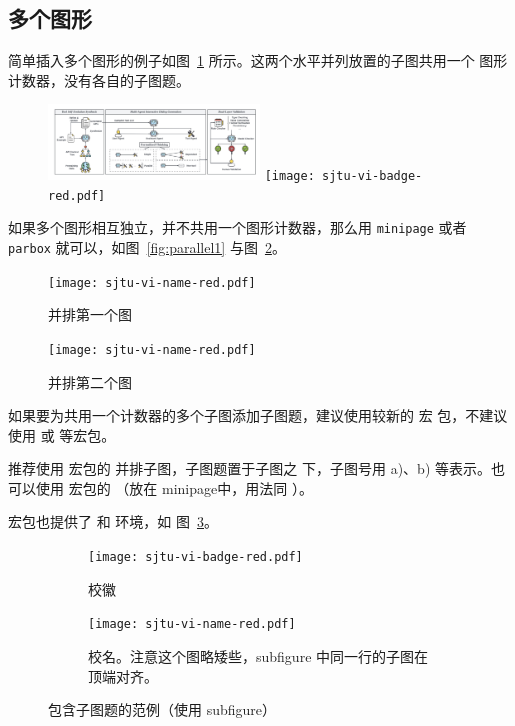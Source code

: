 \subsection{多个图形}

简单插入多个图形的例子如图~\ref{fig:SRR} 所示。这两个水平并列放置的子图共用一个
图形计数器，没有各自的子图题。

\begin{figure}[!htp]
  \centering
  \includegraphics[height=2cm]{../assets/1.png}
  \hspace{1cm}
  \texttt{[image: sjtu-vi-badge-red.pdf]}
  \label{fig:SRR}
\end{figure}

如果多个图形相互独立，并不共用一个图形计数器，那么用 \texttt{minipage} 或者
\texttt{parbox} 就可以，如图~\ref{fig:parallel1} 与图~\ref{fig:parallel2}。

\begin{figure}[!htp]
  \centering
  \begin{minipage}{0.48\textwidth}
    \centering
    \texttt{[image: sjtu-vi-name-red.pdf]}
    \caption{并排第一个图}
    \label{fig:parallel1}
  \end{minipage}\hfill
  \begin{minipage}{0.48\textwidth}
    \centering
    \texttt{[image: sjtu-vi-name-red.pdf]}
    \caption{并排第二个图}
    \label{fig:parallel2}
  \end{minipage}
\end{figure}

如果要为共用一个计数器的多个子图添加子图题，建议使用较新的  宏
包，不建议使用  或  等宏包。

推荐使用  宏包的  并排子图，子图题置于子图之
下，子图号用 a)、b) 等表示。也可以使用  宏包的 
（放在 minipage中，用法同 ）。

 宏包也提供了  和  环境，如
图~\ref{fig:subfigure}。

\begin{figure}[!htp]
  \centering
  \begin{subfigure}{0.3\textwidth}
    \centering
    \texttt{[image: sjtu-vi-badge-red.pdf]}
    \caption{校徽}
  \end{subfigure}
  \hspace{1cm}
  \begin{subfigure}{0.4\textwidth}
    \centering
    \texttt{[image: sjtu-vi-name-red.pdf]}
    \caption{校名。注意这个图略矮些，subfigure 中同一行的子图在顶端对齐。}
  \end{subfigure}
  \caption{包含子图题的范例（使用 subfigure）}
  \label{fig:subfigure}
\end{figure}

